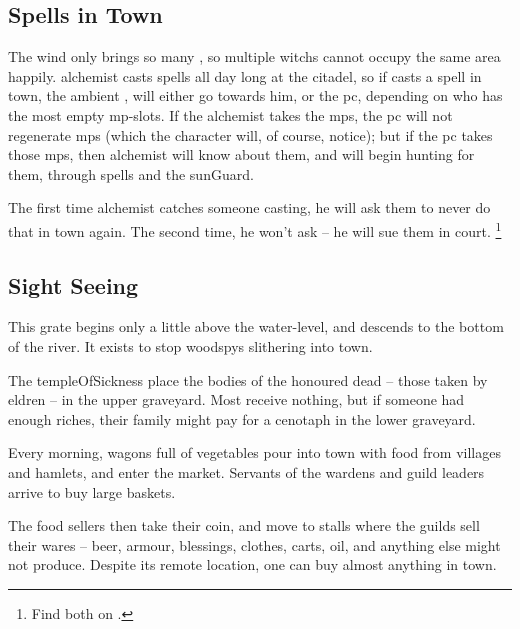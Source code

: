 \begin{multicols}{2}

\subsection{Spells in Town}

The wind only brings so many , so multiple \glspl{witch} cannot occupy the same area happily.
\Gls{alchemist} casts spells all day long at the citadel, so if  casts a spell in town, the ambient , will either go towards him, or the \gls{pc}, depending on who has the most empty \gls{mp}-slots.
If the \gls{alchemist} takes the \glspl{mp}, the \gls{pc} will not regenerate \glspl{mp} (which the character will, of course, notice); but if the \gls{pc} takes those \glspl{mp}, then \gls{alchemist} will know about them, and will begin hunting for them, through spells and the \gls{sunGuard}.

The first time \gls{alchemist} catches someone \gls{casting}, he will ask them to never do that in town again.
The second time, he won't ask -- he will sue them in \gls{court}.%
\footnote{Find both on .}

\subsection{Sight Seeing}


This grate begins only a little above the water-level, and descends to the bottom of the river.
It exists to stop \glspl{woodspy}%
slithering into \gls{town}.


The \gls{templeOfSickness} place the bodies of the honoured dead -- those taken by \gls{eldren} -- in the upper graveyard.
Most receive nothing, but if someone had enough riches, their family might pay for a cenotaph in the lower graveyard.


Every morning, wagons full of vegetables pour into \gls{town} with food from \glspl{village} and hamlets, and enter the market.
Servants of the \glspl{warden} and guild leaders arrive to buy large baskets.

The food sellers then take their coin, and move to stalls where the guilds sell their wares -- beer, armour, blessings, clothes, carts, oil, and anything else  might not produce.
Despite its remote location, one can buy almost anything in \gls{town}.


\end{multicols}
